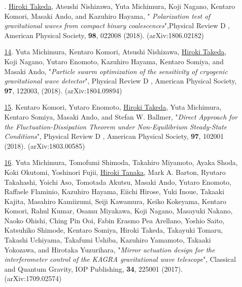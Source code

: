 \documentclass[uplatex, 12pt]{article}
\newcommand{\ctext}[1]{\ooalign{
\hfil\resizebox{\width}{\height}{#1}\hfil
\crcr
\raise.2mm\hbox{\large$\bigcirc$}}}
\begin{document}
\begin{enumerate}
\item[\uline{\ctext{13}}.] \uline{Hiroki Takeda}, Atsushi Nishizawa, Yuta Michimura, Koji Nagano, Kentaro Komori, Masaki Ando, and Kazuhiro Hayama, " \emph{Polarization test of gravitational waves from compact binary coalescences}",Physical Review D , American Physical Society, {\bf 98}, 022008 (2018). (arXiv:1806.02182)\\

\item[\uline{14}.] Yuta Michimura, Kentaro Komori, Atsushi Nishizawa, \uline{Hiroki Takeda}, Koji Nagano, Yutaro Enomoto, Kazuhiro Hayama, Kentaro Somiya, and Masaki Ando, "\emph{Particle swarm optimization of the sensitivity of cryogenic gravitational wave detector}", Physical Review D , American Physical Society, {\bf 97}, 122003, (2018). (arXiv:1804.09894)\\

\item[\uline{15}.] Kentaro Komori, Yutaro Enomoto, \uline{Hiroki Takeda}, Yuta Michimura, Kentaro Somiya, Masaki Ando, and Stefan W. Ballmer, "\emph{Direct Approach for the Fluctuation-Dissipation Theorem under Non-Equilibrium Steady-State Conditions}", Physical Review D , American Physical Society, {\bf 97}, 102001 (2018). (arXiv:1803.00585)\\

\item[\uline{16}.] Yuta Michimura, Tomofumi Shimoda, Takahiro Miyamoto, Ayaka Shoda, Koki Okutomi, Yoshinori Fujii, \uline{Hiroki Tanaka}, Mark A. Barton, Ryutaro Takahashi, Yoichi Aso, Tomotada Akutsu, Masaki Ando, Yutaro Enomoto, Raffaele Flaminio, Kazuhiro Hayama, Eiichi Hirose, Yuki Inoue, Takaaki Kajita, Masahiro Kamiizumi, Seiji Kawamura, Keiko Kokeyama, Kentaro Komori, Rahul Kumar, Osamu Miyakawa, Koji Nagano, Masayuki Nakano, Naoko Ohishi, Ching Pin Ooi, Fabin Erasmo Pea Arellano, Yoshio Saito, Katsuhiko Shimode, Kentaro Somiya, Hiroki Takeda, Takayuki Tomaru, Takashi Uchiyama, Takafumi Ushiba, Kazuhiro Yamamoto, Takaaki Yokozawa, and Hirotaka Yuzurihara, "\emph{Mirror actuation design for the interferometer control of the KAGRA gravitational wave telescope}", Classical and Quantum Gravity, IOP Publishing, {\bf 34}, 225001 (2017). (arXiv:1709.02574)
\end{enumerate}
\end{document}
